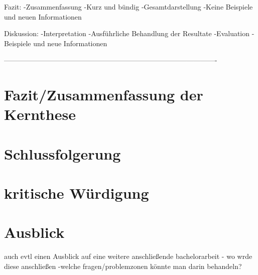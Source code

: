 Fazit:       
    -Zusammenfassung 	
    -Kurz und bündig 	
    -Gesamtdarstellung 	
    -Keine Beispiele und neuen Informationen 	

Diskussion:
    -Interpretation
    -Ausführliche Behandlung der Resultate
    -Evaluation
    -Beispiele und neue Informationen

-------------------------------------------------------------------------------------------

\section{Fazit/Zusammenfassung der Kernthese}
\label{sec:Schluss:Fazit/Zusammenfassung der Kernthese}

\section{Schlussfolgerung}
\label{sec:Schlussfolgerung}

\section{kritische Würdigung}
\label{sec:kritische Würdigung}

\section{Ausblick}
\label{Ausblick}


auch evtl einen Ausblick auf eine weitere anschließende bachelorarbeit
        - wo wrde diese anschließen
        -welche fragen/problemzonen könnte man darin behandeln?